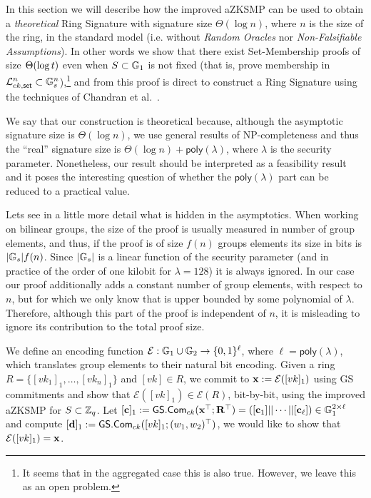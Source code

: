 In this section we will describe how the improved aZKSMP can be used to obtain a \emph{theoretical} Ring Signature with signature size \(\Theta(\log n)\), where \(n\) is the size of the ring, in the standard model (i.e. without \emph{Random Oracles} nor \emph{Non-Falsifiable Assumptions}). In other words we show that there exist Set-Membership proofs of size \(\Theta(\log t )\) even when \(S\subset \mathbb{G}_1\) is not fixed (that is, prove membership in $\mathcal{L}_{ck,\mathsf{set}}^n\subset\mathbb{G}_s^n$),\footnote{It seems that in the aggregated case this is also true. However, we leave this as an open problem.} and from this proof is direct to construct a Ring Signature using the techniques of Chandran et al.~\cite{ICALP:ChaGroSah07}.

We say that our construction is theoretical because, although the asymptotic signature size is \(\Theta(\log n)\), we use general results of NP-completeness and thus the ``real'' signature size is \(\Theta(\log n)+\mathsf{poly}(\lambda)\), where \(\lambda\) is the security parameter. Nonetheless, our result should be interpreted as a feasibility result and it poses the interesting question of whether the \(\mathsf{poly}(\lambda)\) part can be reduced to a practical value.

Lets see in a little more detail what is hidden in the asymptotics. When working on bilinear groups, the size of the proof is usually measured in number of group elements, and thus, if the proof is of size $f(n)$ groups elements its size in bits is $|\mathbb{G}_s|f(n)$. Since $|\mathbb{G}_s|$ is a linear function of the security parameter (and in practice of the order of one kilobit for $\lambda=128$) it is always ignored. In our case our proof additionally adds a constant number of group elements, with respect to $n$, but for which we only know that is upper bounded by some polynomial of $\lambda$. Therefore, although this part of the proof is independent of $n$, it is misleading to ignore its contribution to the total proof size.
 
We define an encoding function \(\mathcal{E}:\mathbb{G}_1\cup\mathbb{G}_2\to\{0,1\}^\ell\), where \(\ell=\mathsf{poly}(\lambda)\), which translates group elements to their natural bit encoding. Given a ring \(R=\{[vk_1]_1,\ldots,[vk_n]_1\}\) and \([vk]\in R\), we commit to \(\mathbf{x}:=\mathcal{E}([vk]_1)\) using GS commitments and show that \(\mathcal{E}([vk]_1)\in\mathcal{E}(R)\), bit-by-bit, using the improved aZKSMP for \(S\subset \mathbb{Z}_q\). Let \([\mathbf{c}]_1:={\mathsf{GS}}.\mathsf{Com}_{ck}(\mathbf{x}^\top;\mathbf{{R}}^\top)=([\mathbf{c}_1]||\cdots||[\mathbf{c}_\ell])\in\mathbb{G}_1^{2\times \ell}\) and compute \([\mathbf{d}]_1:={\mathsf{GS}}.\mathsf{Com}_{ck}([vk]_1;(w_1,w_2)^\top)\), we would like to show that \(\mathcal{E}([vk]_1)=\mathbf{x}\).

